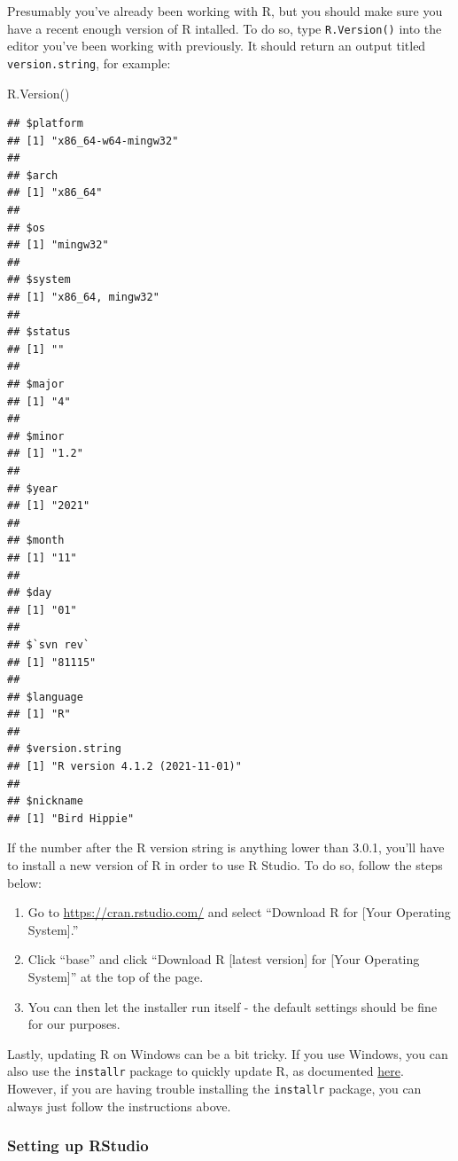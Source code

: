 \documentclass[
]{book}
\newenvironment{Shaded}{\begin{snugshade}}{\end{snugshade}}
\newcommand{\FunctionTok}[1]{\textcolor[rgb]{0.00,0.00,0.00}{#1}}
\newcommand{\NormalTok}[1]{#1}
\begin{document}
Presumably you've already been working with R, but you should make sure you have a recent enough version of R intalled. To do so, type \texttt{R.Version()} into the editor you've been working with previously. It should return an output titled \texttt{version.string}, for example:

\begin{Shaded}
\begin{Highlighting}[]
\FunctionTok{R.Version}\NormalTok{()}
\end{Highlighting}
\end{Shaded}

\begin{verbatim}
## $platform
## [1] "x86_64-w64-mingw32"
## 
## $arch
## [1] "x86_64"
## 
## $os
## [1] "mingw32"
## 
## $system
## [1] "x86_64, mingw32"
## 
## $status
## [1] ""
## 
## $major
## [1] "4"
## 
## $minor
## [1] "1.2"
## 
## $year
## [1] "2021"
## 
## $month
## [1] "11"
## 
## $day
## [1] "01"
## 
## $`svn rev`
## [1] "81115"
## 
## $language
## [1] "R"
## 
## $version.string
## [1] "R version 4.1.2 (2021-11-01)"
## 
## $nickname
## [1] "Bird Hippie"
\end{verbatim}

If the number after the R version string is anything lower than 3.0.1, you'll have to install a new version of R in order to use R Studio. To do so, follow the steps below:

\begin{enumerate}
\def\labelenumi{\arabic{enumi}.}
\item
  Go to \url{https://cran.rstudio.com/} and select ``Download R for {[}Your Operating System{]}.''
\item
  Click ``base'' and click ``Download R {[}latest version{]} for {[}Your Operating System{]}'' at the top of the page.
\item
  You can then let the installer run itself - the default settings should be fine for our purposes.
\end{enumerate}

Lastly, updating R on Windows can be a bit tricky. If you use Windows, you can also use the \texttt{installr} package to quickly update R, as documented \href{https://www.r-statistics.com/2015/06/a-step-by-step-screenshots-tutorial-for-upgrading-r-on-windows/}{here}. However, if you are having trouble installing the \texttt{installr} package, you can always just follow the instructions above.

\hypertarget{setting-up-rstudio}{%
\subsubsection{Setting up RStudio}\label{setting-up-rstudio}}
\end{document}
